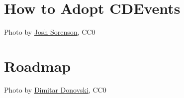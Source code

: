 \documentclass[aspectratio=169,11pt,hyperref={colorlinks=true}]{beamer}
\begin{document}
\section{How to Adopt CDEvents}
\begin{sectionwithpiclargecentral}{Photo by \href{https://unsplash.com/@joshsorenson}{\underline{Josh Sorenson}}, CC0}
\end{sectionwithpiclargecentral}


\section{Roadmap}
\begin{sectionwithpiclargecentral}{Photo by \href{https://unsplash.com/@dmtrdon}{\underline{Dimitar Donovski}}, CC0}
\end{sectionwithpiclargecentral}
\end{document}
